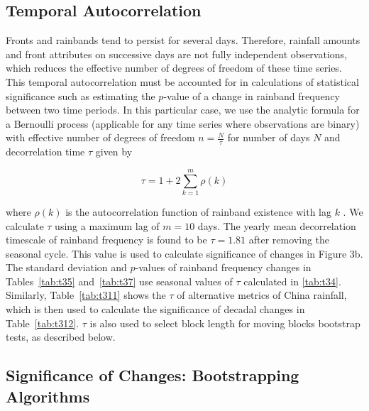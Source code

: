 \documentclass{ametsoc}
\begin{document}

\subsection{Temporal Autocorrelation}

	Fronts and rainbands tend to persist for several days. Therefore, rainfall amounts and front attributes on successive days are not fully independent observations, which reduces the effective number of degrees of freedom of these time series. This temporal autocorrelation must be accounted for in calculations of statistical significance such as estimating the $p$-value of a change in rainband frequency between two time periods. In this particular case, we use the analytic formula for a Bernoulli process (applicable for any time series where observations are binary) with effective number of degrees of freedom $n=\frac{N}{\tau}$ for number of days $N$ and decorrelation time $\tau$ given by

\begin{equation*}
\tau=1+2\sum_{k=1}^m \rho(k)
\end{equation*}

	where $\rho(k)$ is the autocorrelation function of rainband existence with lag $k$ \citep{VonStorch1999}. We calculate $\tau$ using a maximum lag of $m=10$ days. The yearly mean decorrelation timescale of rainband frequency is found to be $\tau = 1.81$ after removing the seasonal cycle. This value is used to calculate significance of changes in Figure 3b. The standard deviation and $p$-values of rainband frequency changes in Tables~\ref{tab:t35} and~\ref{tab:t37} use seasonal values of $\tau$ calculated in \ref{tab:t34}. Similarly, Table~\ref{tab:t311} shows the $\tau$ of alternative metrics of China rainfall, which is then used to calculate the significance of decadal changes in Table~\ref{tab:t312}. $\tau$ is also used to select block length for moving blocks bootstrap tests, as described below.

\subsection{Significance of Changes: Bootstrapping Algorithms}
\end{document}
